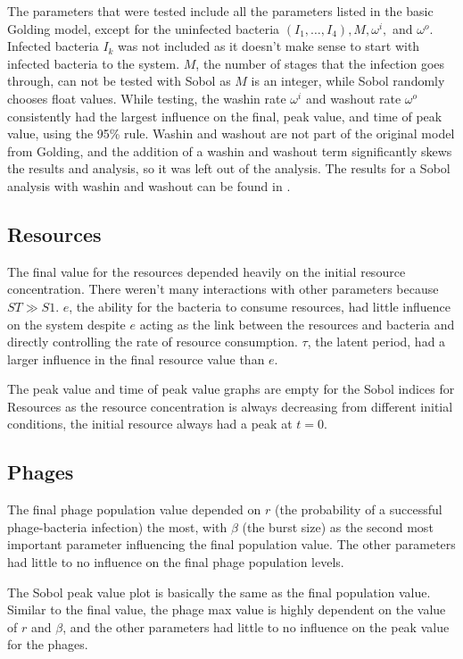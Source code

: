 The parameters that were tested include all the parameters listed in the basic Golding model, except for the uninfected bacteria $(I_1, \dots, I_4), M, \omega^i,$ and $\omega^o$. 
Infected bacteria $I_k$ was not included as it doesn't make sense to start with infected bacteria to the system. 
$M$, the number of stages that the infection goes through, can not be tested with Sobol as $M$ is an integer, while Sobol randomly chooses float values. 
While testing, the washin rate $\omega^i$ and washout rate $\omega^o$ consistently had the largest influence on the final, peak value, and time of peak value, using the 95\% rule. 
Washin and washout are not part of the original model from Golding, and the addition of a washin and washout term significantly skews the results and analysis, so it was left out of the analysis. 
The results for a Sobol analysis with washin and washout can be found in . 

\subsection{Resources}
The final value for the resources depended heavily on the initial resource concentration. 
There weren't many interactions with other parameters because $ST \gg S1$. 
$e$, the ability for the bacteria to consume resources, had little influence on the system despite $e$ acting as the link between the resources and bacteria and directly controlling the rate of resource consumption. 
$\tau$, the latent period, had a larger influence in the final resource value than $e$. 

The peak value and time of peak value graphs are empty for the Sobol indices for Resources as the resource concentration is always decreasing from different initial conditions, the initial resource always had a peak at $t=0$. 

\subsection{Phages}
The final phage population value depended on $r$ (the probability of a successful phage-bacteria infection) the most, with $\beta$ (the burst size) as the second most important parameter influencing the final population value. 
The other parameters had little to no influence on the final phage population levels. 

The Sobol peak value plot is basically the same as the final population value. 
Similar to the final value, the phage max value is highly dependent on the value of $r$ and $\beta$, and the other parameters had little to no influence on the peak value for the phages. 

